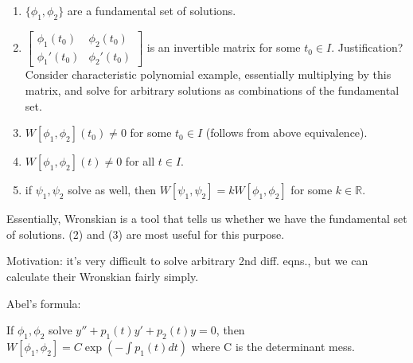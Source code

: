 \documentclass{article}
\newcommand{\R}{\mathbb{R}}
\begin{document}
\begin{enumerate}
    \item $\{\phi_1, \phi_2\}$ are a fundamental set of solutions.
    \item $\begin{bmatrix}
        \phi_1(t_0) & \phi_2(t_0) \\
        \phi_1'(t_0) & \phi_2'(t_0)
        \end{bmatrix}$
        is an invertible matrix for some $t_0 \in I$. Justification? Consider characteristic polynomial example, essentially multiplying by this matrix, and solve for arbitrary solutions as combinations of the fundamental set.
    \item $W[\phi_1, \phi_2](t_0) \neq 0 $ for some $t_0 \in I$ (follows from above equivalence).
    \item $W[\phi_1, \phi_2](t) \neq 0$ for all $t \in I$.
    \item if $\psi_1, \psi_2$ solve as well, then $W[\psi_1, \psi_2]=kW[\phi_1, \phi_2]$ for some $k\in\R$.
\end{enumerate}

Essentially, Wronskian is a tool that tells us whether we have the fundamental set of solutions. (2) and (3) are most useful for this purpose.

Motivation: it's very difficult to solve arbitrary 2nd diff. eqns., but we can calculate their Wronskian fairly simply.

Abel's formula:

If $\phi_1, \phi_2$ solve $y'' + p_1(t)y' + p_2(t)y = 0$, then $W[\phi_1, \phi_2] = C \exp(-\int p_1(t)dt)$ where C is the determinant mess.
\end{document}
